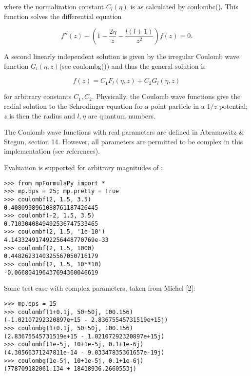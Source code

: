where the normalization constant $C_l(\eta)$ is as calculated by coulombc(). This function solves the differential equation

\begin{equation}
f''(z)+\left(1-\frac{2\eta}{z}-\frac{l(l+1)}{z^2} \right) f(z)=0.
\end{equation}


A second linearly independent solution is given by the irregular Coulomb wave function $G_l(\eta, z) $(see coulombg()) and thus the general solution is

\begin{equation}
f(z) = C_1 F_l(\eta, z) + C_2 G_l(\eta, z) 
\end{equation}


for arbitrary constants $C_1, C_2$. Physically, the Coulomb wave functions give the radial solution to the Schrodinger equation for a point particle in a $1/z$ potential; $z$ is then the radius and $l, \eta$ are quantum numbers.

\vpara
The Coulomb wave functions with real parameters are defined in Abramowitz \& Stegun, section 14. However, all parameters are permitted to be complex in this implementation (see references).


Evaluation is supported for arbitrary magnitudes of :

\begin{lstlisting}
>>> from mpFormulaPy import *
>>> mp.dps = 25; mp.pretty = True
>>> coulombf(2, 1.5, 3.5)
0.4080998961088761187426445
>>> coulombf(-2, 1.5, 3.5)
0.7103040849492536747533465
>>> coulombf(2, 1.5, '1e-10')
4.143324917492256448770769e-33
>>> coulombf(2, 1.5, 1000)
0.4482623140325567050716179
>>> coulombf(2, 1.5, 10**10)
-0.066804196437694360046619
\end{lstlisting}



Some test case with complex parameters, taken from Michel [2]:

\begin{lstlisting}
>>> mp.dps = 15
>>> coulombf(1+0.1j, 50+50j, 100.156)
(-1.02107292320897e+15 - 2.83675545731519e+15j)
>>> coulombg(1+0.1j, 50+50j, 100.156)
(2.83675545731519e+15 - 1.02107292320897e+15j)
>>> coulombf(1e-5j, 10+1e-5j, 0.1+1e-6j)
(4.30566371247811e-14 - 9.03347835361657e-19j)
>>> coulombg(1e-5j, 10+1e-5j, 0.1+1e-6j)
(778709182061.134 + 18418936.2660553j)
\end{lstlisting}





